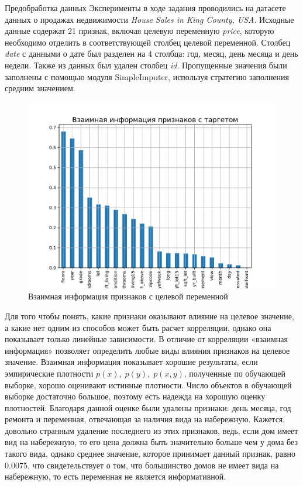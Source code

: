 \documentclass[12pt]{article}
\begin{document}
\begin{section}{Предобработка данных}
Эксперименты в ходе задания проводились на датасете данных о продажах недвижимости \emph{House Sales in King County, USA}. Исходные данные содержат 21 признак, включая целевую переменную \emph{price}, которую необходимо отделить в соответствующей столбец целевой переменной. Столбец \emph{date} с данными о дате был разделен на 4 столбца: год, месяц, день месяца и день недели. Также из данных был удален столбец \emph{id}. Пропущенные значения были заполнены с помощью модуля SimpleImputer, используя стратегию заполнения средним значением. 

\begin{figure}[h]
\centering
\includegraphics[width=1\linewidth]{1.pdf}
\caption{Взаимная информация признаков с целевой переменной}
\label{fig:mpr}
\end{figure}

Для того чтобы понять, какие признаки оказывают влияние на целевое значение, а какие нет одним из способов может быть расчет корреляции, однако она показывает только линейные зависимости. В отличие от корреляции «взаимная информация» позволяет определить любые виды влияния признаков на целевое значение. Взаимная информация показывает хорошие результаты, если эмпирические плотности $p(x), \; p(y), \; p(x, y)$, полученные по обучающей выборке, хорошо оценивают истинные плотности. Число объектов в обучающей выборке достаточно большое, поэтому есть надежда на хорошую оценку плотностей. Благодаря данной оценке были удалены признаки: день месяца, год ремонта и переменная, отвечающая за наличия вида на набережную. Кажется, довольно странным удаление последнего из этих признаков, ведь, если дом имеет вид на набережную, то его цена должна быть значительно больше чем у дома без такого вида, однако среднее значение, которое принимает данный признак, равно 0.0075, что свидетельствует о том, что большинство домов не имеет вида на набережную, то есть переменная не является информативной.


\end{section}
\end{document}
